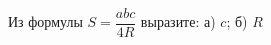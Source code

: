 \begin{ex}
	\begin{condition}
		Из формулы \( S=\dfrac{abc}{4R} \) выразите: а) \( c \); б) \( R \)
	\end{condition}
\end{ex}